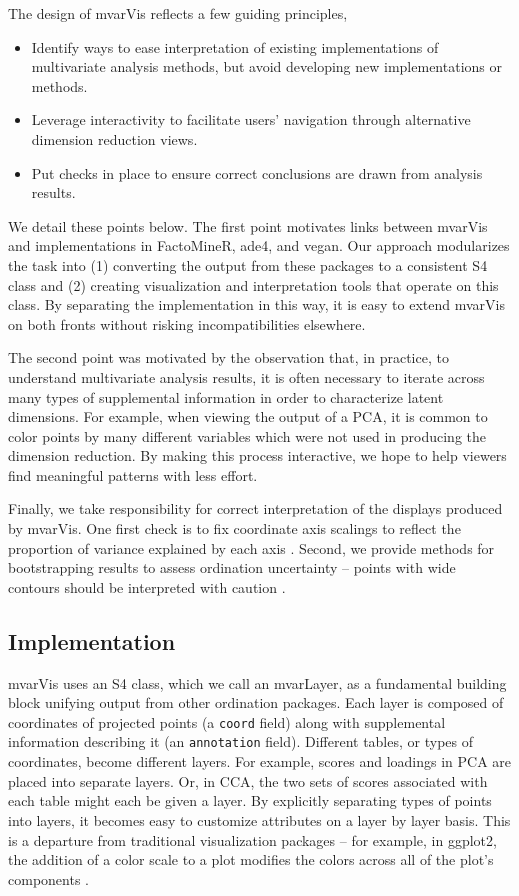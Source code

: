 The design of mvarVis reflects a few guiding principles,
\begin{itemize}
\item Identify ways to ease interpretation of existing implementations of
  multivariate analysis methods, but avoid developing new implementations or
  methods.
\item Leverage interactivity to facilitate users' navigation through alternative
  dimension reduction views.
\item Put checks in place to ensure correct conclusions are drawn from analysis
  results.
\end{itemize}

We detail these points below. The first point motivates links between mvarVis
and implementations in FactoMineR, ade4, and vegan. Our approach modularizes the
task into (1) converting the output from these packages to a consistent S4 class
and (2) creating visualization and interpretation tools that operate on this
class. By separating the implementation in this way, it is easy to extend
mvarVis on both fronts without risking incompatibilities elsewhere.

The second point was motivated by the observation that, in practice, to
understand multivariate analysis results, it is often necessary to iterate
across many types of supplemental information in order to characterize latent
dimensions. For example, when viewing the output of a PCA, it is common to color
points by many different variables which were not used in producing the
dimension reduction. By making this process interactive, we hope to help viewers
find meaningful patterns with less effort.

Finally, we take responsibility for correct interpretation of the displays
produced by mvarVis. One first check is to fix coordinate axis scalings to
reflect the proportion of variance explained by each axis
\citep{fukuyama2017multidomain}. Second, we provide methods for bootstrapping
results to assess ordination uncertainty -- points with wide contours should be
interpreted with caution \citep{efron1992bootstrap}.

\subsection{Implementation}

mvarVis uses an S4 class, which we call an mvarLayer, as a fundamental building
block unifying output from other ordination packages. Each layer is composed of
coordinates of projected points (a \texttt{coord} field) along with supplemental
information describing it (an \texttt{annotation} field). Different tables, or
types of coordinates, become different layers. For example, scores and loadings
in PCA are placed into separate layers. Or, in CCA, the two sets of scores
associated with each table might each be given a layer. By explicitly separating
types of points into layers, it becomes easy to customize attributes on a layer
by layer basis. This is a departure from traditional visualization packages --
for example, in ggplot2, the addition of a color scale to a plot modifies the
colors across all of the plot's components \citep{wickham2010ggplot2}.

